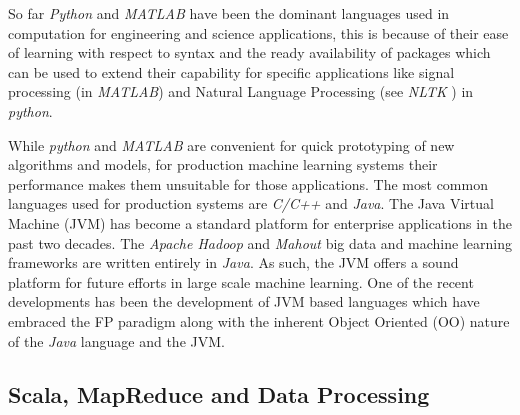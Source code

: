 So far \textit{Python} and \textit{MATLAB} have been the dominant languages used in computation for engineering and science applications, this is because of their ease of learning with respect to syntax and the ready availability of packages which can be used to extend their capability for specific applications like signal processing (in \textit{MATLAB}) and Natural Language Processing (see \textit{NLTK} \cite{NLTK} ) in \textit{python}.

While \textit{python} and \textit{MATLAB} are convenient for quick prototyping of new algorithms and models, for production machine learning systems their performance makes them unsuitable for those applications. The most common languages used for production systems are \textit{C/C++} and \textit{Java}. The Java Virtual Machine (JVM) has become a standard platform for enterprise applications in the past two decades. The \textit{Apache Hadoop} and \textit{Mahout} big data and machine learning frameworks are written entirely in \textit{Java}. As such, the JVM offers a sound platform for future efforts in large scale machine learning. One of the recent developments has been the development of JVM based languages which have embraced the FP paradigm along with the inherent Object Oriented (OO) nature of the \textit{Java} language and the JVM.

\subsection*{Scala, MapReduce and Data Processing}


